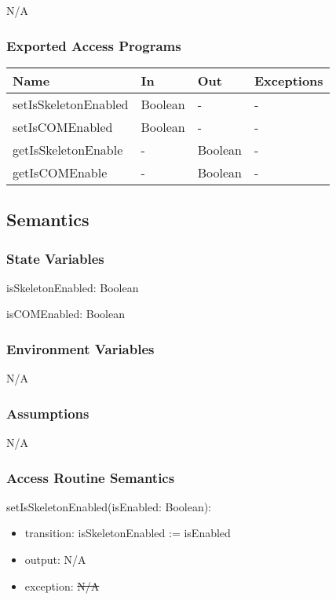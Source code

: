 \documentclass[12pt, titlepage]{article}
\newcommand{\rt}[1]{\textcolor{red}{#1}}
\begin{document}
N/A

\subsubsection{Exported Access Programs}

\begin{center}
  \begin{tabular}{p{4cm} p{4cm} p{4cm} p{2cm}}
    \hline
    \textbf{Name}              & \textbf{In}   & \textbf{Out}  & \textbf{Exceptions} \\
    \hline
    setIsSkeletonEnabled & Boolean & -       & -             \\
    setIsCOMEnabled      & Boolean & -       & -             \\
    getIsSkeletonEnable  & -       & Boolean & -             \\
    getIsCOMEnable       & -       & Boolean & -             \\
    \hline
  \end{tabular}
\end{center}

\subsection{Semantics}

\subsubsection{State Variables}

\noindent isSkeletonEnabled: Boolean

\noindent isCOMEnabled: Boolean

\subsubsection{Environment Variables}

N/A

\subsubsection{Assumptions}

N/A

\subsubsection{Access Routine Semantics}

\noindent setIsSkeletonEnabled(isEnabled: Boolean):
\begin{itemize}
\item transition: isSkeletonEnabled := isEnabled
\item output: N/A
\item exception: \sout{N/A} \rt{}
\end{itemize}
\end{document}
